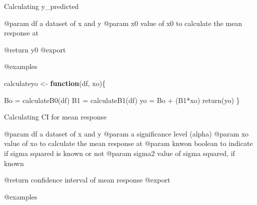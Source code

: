 \documentclass[
]{article}
\newenvironment{Shaded}{\begin{snugshade}}{\end{snugshade}}
\newcommand{\ControlFlowTok}[1]{\textcolor[rgb]{0.13,0.29,0.53}{\textbf{#1}}}
\newcommand{\FunctionTok}[1]{\textcolor[rgb]{0.00,0.00,0.00}{#1}}
\newcommand{\NormalTok}[1]{#1}
\newcommand{\OtherTok}[1]{\textcolor[rgb]{0.56,0.35,0.01}{#1}}
\newcommand{\SpecialCharTok}[1]{\textcolor[rgb]{0.00,0.00,0.00}{#1}}
\begin{document}
Calculating y\_predicted

@param df a dataset of x and y @param x0 value of x0 to calculate the
mean response at

@return y0 @export

@examples

\begin{Shaded}
\begin{Highlighting}[]
\NormalTok{calculateyo }\OtherTok{\textless{}{-}} \ControlFlowTok{function}\NormalTok{(df, xo)\{}
  
\NormalTok{  Bo }\OtherTok{=} \FunctionTok{calculateB0}\NormalTok{(df)}
\NormalTok{  B1 }\OtherTok{=} \FunctionTok{calculateB1}\NormalTok{(df)}
\NormalTok{  yo }\OtherTok{=}\NormalTok{ Bo }\SpecialCharTok{+}\NormalTok{ (B1}\SpecialCharTok{*}\NormalTok{xo)}
  \FunctionTok{return}\NormalTok{(yo)}
\NormalTok{\}}
\end{Highlighting}
\end{Shaded}

Calculating CI for mean response

@param df a dataset of x and y @param a significance level (alpha)
@param xo value of xo to calculate the mean response at @param knwon
boolean to indicate if sigma squared is known or not @param sigma2 value
of sigma squared, if known

@return confidence interval of mean response @export

@examples
\end{document}
